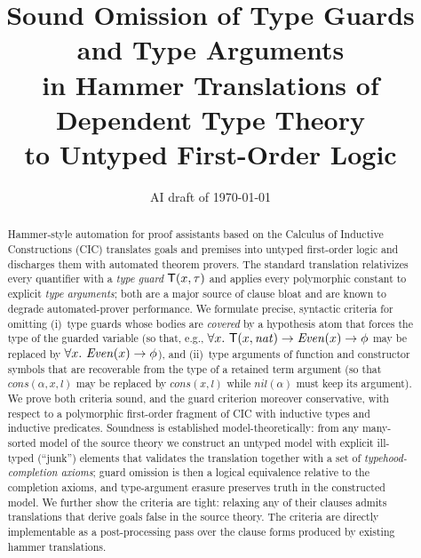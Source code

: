 \documentclass[11pt,a4paper]{article}
\title{Sound Omission of Type Guards and Type Arguments\\
  in Hammer Translations of Dependent Type Theory\\
  to Untyped First-Order Logic}
\author{}
\date{AI draft of \today}
\begin{document}
\maketitle

\begin{abstract}
  Hammer-style automation for proof assistants based on the Calculus of
  Inductive Constructions (CIC) translates goals and premises into untyped
  first-order logic and discharges them with automated theorem provers.  The
  standard translation relativizes every quantifier with a \emph{type guard}
  $\mathsf{T}(x,\tau)$ and applies every polymorphic constant to explicit \emph{type
  arguments}; both are a major source of clause bloat and are known to degrade
  automated-prover performance.  We formulate precise, syntactic criteria for
  omitting (i)~type guards whose bodies are \emph{covered} by a hypothesis
  atom that forces the type of the guarded variable (so that, e.g.,
  $\forall x.\ \mathsf{T}(x,\mathit{nat}) \rightarrow \mathit{Even}(x) \rightarrow \phi$ may be
  replaced by $\forall x.\ \mathit{Even}(x) \rightarrow \phi$), and (ii)~type
  arguments of function and constructor symbols that are recoverable from the
  type of a retained term argument (so that $\mathit{cons}(\alpha,x,l)$ may be
  replaced by $\mathit{cons}(x,l)$ while $\mathit{nil}(\alpha)$ must keep its
  argument).  We prove both criteria sound, and the guard criterion moreover
  conservative, with respect to a polymorphic first-order fragment of CIC with
  inductive types and inductive predicates.  Soundness is established
  model-theoretically: from any many-sorted model of the source theory we
  construct an untyped model with explicit ill-typed (``junk'') elements that
  validates the translation together with a set of \emph{typehood-completion
  axioms}; guard omission is then a logical equivalence relative to the
  completion axioms, and type-argument erasure preserves truth in the
  constructed model.  We further show the criteria are tight: relaxing any of
  their clauses admits translations that derive goals false in the source
  theory.  The criteria are directly implementable as a post-processing pass
  over the clause forms produced by existing hammer translations.
\end{abstract}

\tableofcontents













\end{document}
